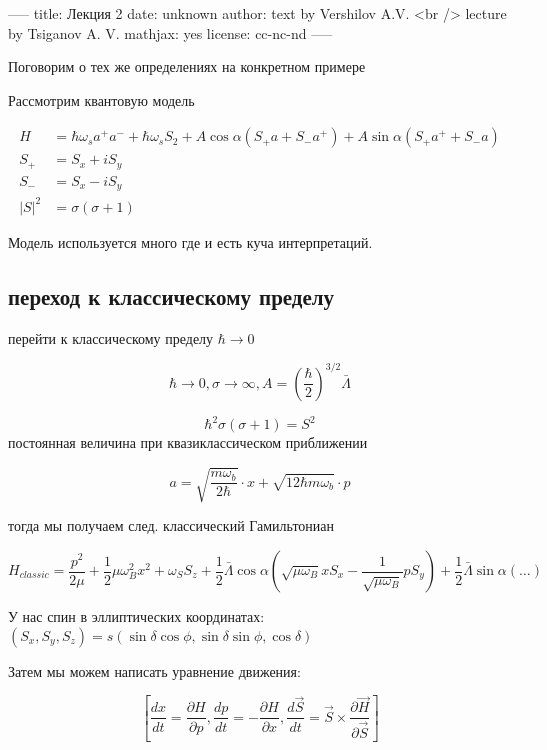 -----
title: Лекция 2
date: unknown
author: text by Vershilov A.V. <br /> lecture by Tsiganov A. V.
mathjax: yes
license: cc-nc-nd
-----

Поговорим о тех же определениях на конкретном примере

Рассмотрим квантовую модель 

\begin{equation}
  \begin{align}
      H &= \hbar  \omega_s a^+a^- + \hbar \omega_s S_2 
    + A \cos \alpha (S_+a +S_-a^+)
    + A \sin \alpha (S_+a^+ + S_-a) \\
    S_+ &= S_x+iS_y \\
    S_- &= S_x-iS_y \\
    |S|^2 &= \sigma(\sigma+1)
  \end{align}
\end{equation}

Модель используется много где и есть куча интерпретаций.

\subsection{переход к классическому пределу}
перейти к классическому пределу $\hbar \rightarrow 0$

\begin{equation}
  \hbar \rightarrow 0, \sigma \rightarrow \infty, A = \left(\frac{\hbar}{2}\right)^{3/2} \bar{\Lambda}
\end{equation}

$$ \hbar^2 \sigma(\sigma+1)= S^2$$
постоянная величина при квазиклассическом приближении

$$a=\sqrt{\frac{m\omega_b}{2\hbar}}\cdot x + \sqrt{{1}{2\hbar m\omega_b}}\cdot p$$

тогда мы получаем след. классический Гамильтониан

$$H_{classic} = \frac{p^2}{2\mu} + \frac{1}{2} \mu \omega_B^2x^2+\omega_SS_z
  +\frac{1}{2}\bar\Lambda\cos\alpha(\sqrt{\mu\omega_B}xS_x - \frac{1}{\sqrt{\mu\omega_B}}pS_y)
  +\frac{1}{2}\bar\Lambda\sin\alpha(\ldots)$$

У нас спин в эллиптических координатах: $(S_x,S_y,S_z) = s(\sin\delta\cos\phi,\sin\delta\sin\phi,\cos\delta)$

Затем мы можем написать уравнение движения:

$$ \left[ \frac{dx}{dt} = \frac{\partial H}{\partial p}
   , \frac{dp}{dt} = - \frac{\partial H}{\partial x}
   , \frac{d\vec S}{dt} = \vec{S} \times \frac{\partial\vec H}{\partial\vec S}
   \right] $$

